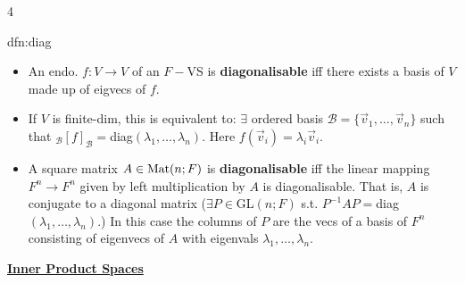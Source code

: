 \documentclass[landscape, 8pt]{extarticle}
\begin{document}
\begin{multicols*}{4}
		
		\begin{dfn}[Diagonalisability]{dfn:diag}{ }
			\begin{itemize}
			\item An endo. $f: V \to V$ of an $F-$VS is \textbf{diagonalisable} iff there exists a basis of $V$ made up of eigvecs of $f$. \\
			\item If $V$ is finite-dim, this is equivalent to: $\exists$ ordered basis $\mathcal{B} = \{\vec{v}_1, \dots, \vec{v}_n\}$ such that $_\mathcal{B}[f]_\mathcal{B} = $diag$(\lambda_1, \dots, \lambda_n)$. Here $f(\vec{v}_i) = \lambda_i \vec{v}_i$.\\
			\item A square matrix $A \in \operatorname{Mat}(n; F)$ is \textbf{diagonalisable} iff the linear mapping $F^n \to F^n$ given by left multiplication by $A$ is diagonalisable. That is, $A$ is conjugate to a diagonal matrix ($\exists P \in $GL$(n; F)$ s.t. $P^{-1}AP = $diag$(\lambda_1, \dots, \lambda_n)$.) In this case the columns of $P$ are the vecs of a basis of $F^n$ consisting of eigenvecs of $A$ with eigenvals $\lambda_1, \dots, \lambda_n$.
			\end{itemize}
			
		\end{dfn}
		
		
		
	
	
	{\footnotesize \textbf{\underline{Inner Product Spaces}}}
		

\end{multicols*}
\end{document}
